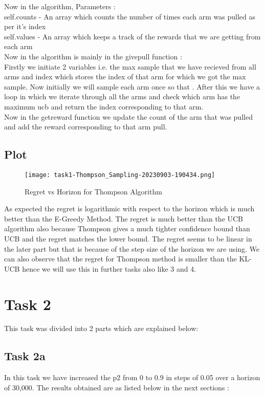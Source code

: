 \documentclass{article}
\begin{document}
Now in the algorithm, Parameters : \\
self.counts - An array which counts the number of times each arm was pulled as per it's index\\
self.values - An array which keeps a track of the rewards that we are getting from each arm\\

Now in the algorithm is mainly in the givepull function :\\
Firstly we initiate 2 variables i.e. the max sample that we have recieved from all arms and index which stores the index of that arm for which we got the max sample. Now initially we will sample each arm once so that . After this we have a loop in which we iterate through all the arms and check which arm has the maximum ucb and return the index corresponding to that arm.\\

Now in the getreward function we update the count of the arm that was pulled and add the reward corresponding to that arm pull.

\subsection{Plot}
\begin{figure}[H]
\centering
\texttt{[image: task1-Thompson\_Sampling-20230903-190434.png]}
\caption{Regret vs Horizon for Thompson Algorithm}
\end{figure}


As expected the regret is logarithmic with respect to the horizon which is much better than the E-Greedy Method. The regret is much better than the UCB algorithm also because Thompson gives a much tighter confidence bound than UCB and the regret matches the lower bound. The regret seems to be linear in the later part but that is because of the step size of the horizon we are using. We can also observe that the regret for Thompson method is smaller than the KL-UCB hence we will use this in further tasks also like 3 and 4.

\section{Task 2}
This task was divided into 2 parts which are explained below:

\subsection{Task 2a}
In this task we have increased the p2 from 0 to 0.9 in steps of 0.05 over a horizon of 30,000. The results obtained are as listed below in the next sections :
\end{document}
